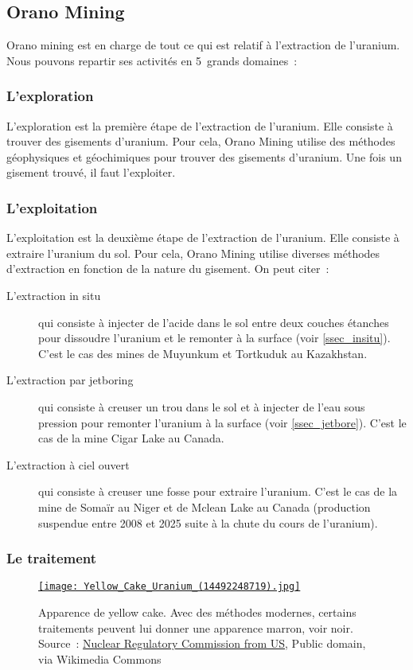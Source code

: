 \subsection{Orano Mining}

Orano mining est en charge de tout ce qui est relatif à l'extraction de l'uranium. Nous pouvons repartir ses activités en 5~grands domaines~:%
\subsubsection{L'exploration}
L'exploration est la première étape de l'extraction de l'uranium. Elle consiste à trouver des gisements d'uranium. Pour cela, Orano Mining utilise des méthodes géophysiques et géochimiques pour trouver des gisements d'uranium. Une fois un gisement trouvé, il faut l'exploiter.

\subsubsection{L'exploitation}
L'exploitation est la deuxième étape de l'extraction de l'uranium. Elle consiste à extraire l'uranium du sol. Pour cela, Orano Mining utilise diverses méthodes d'extraction en fonction de la nature du gisement. On peut citer~:
\begin{description}
    \item [L'extraction in situ] qui consiste à injecter de l'acide dans le sol entre deux couches étanches pour dissoudre l'uranium et le remonter à la surface (voir \cref{ssec_insitu}). C'est le cas des mines de Muyunkum et Tortkuduk au Kazakhstan.
    \item [L'extraction par jetboring]qui consiste à creuser un trou dans le sol et à injecter de l'eau sous pression pour remonter l'uranium à la surface (voir \cref{ssec_jetbore}). C'est le cas de la mine Cigar Lake au Canada.
    \item [L'extraction à ciel ouvert]qui consiste à creuser une fosse pour extraire l'uranium. C'est le cas de la mine de Somaïr au Niger et de Mclean Lake au Canada (production suspendue entre 2008 et 2025 suite à la chute du cours de l'uranium).
\end{description}


\subsubsection{Le traitement}
\begin{wrapfigure}{r}{0.5\textwidth}
    \centering
    \href{https://commons.wikimedia.org/wiki/File:Yellow_Cake_Uranium_(14492248719).jpg}{\texttt{[image: Yellow\_Cake\_Uranium\_(14492248719).jpg]}}
    \caption[Apparence du yellow cake]{Apparence de yellow cake. Avec des méthodes modernes, certains traitements peuvent lui donner une apparence marron, voir noir. Source~: \href{https://commons.wikimedia.org/wiki/File:Yellow_Cake_Uranium_(14492248719).jpg}{Nuclear Regulatory Commission from US}, Public domain, via Wikimedia Commons}
    \label{fig_yellow-cake}
\end{wrapfigure}

